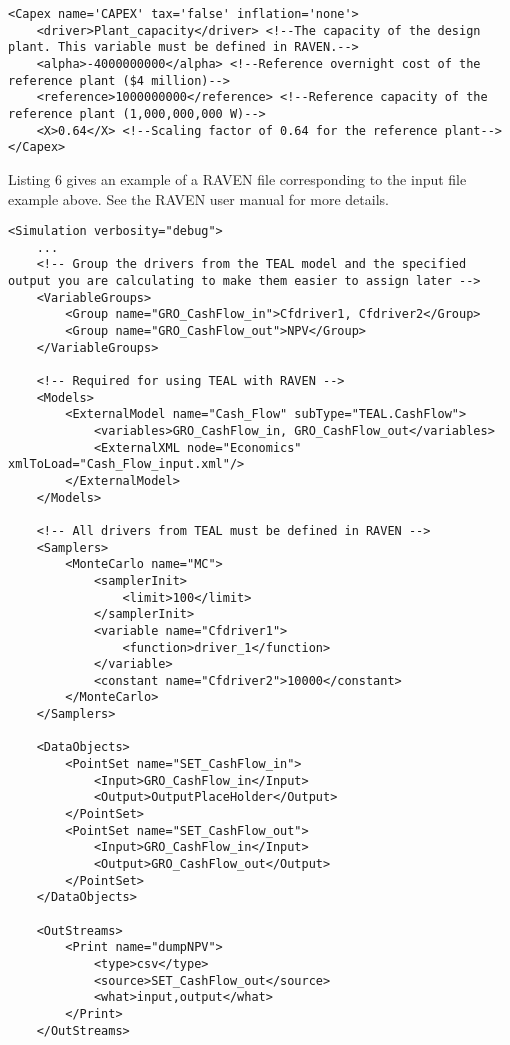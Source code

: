 \begin{lstlisting}[style=XML,morekeywords={anAttribute},caption=CashFlow input example., label=lst:CashFlowExample]
<Capex name='CAPEX' tax='false' inflation='none'>
    <driver>Plant_capacity</driver> <!--The capacity of the design plant. This variable must be defined in RAVEN.-->
    <alpha>-4000000000</alpha> <!--Reference overnight cost of the reference plant ($4 million)-->
    <reference>1000000000</reference> <!--Reference capacity of the reference plant (1,000,000,000 W)-->
    <X>0.64</X> <!--Scaling factor of 0.64 for the reference plant-->
</Capex>
\end{lstlisting}

Listing 6 gives an example of a RAVEN file corresponding to the input file example above. See the RAVEN user manual for more details.
\begin{lstlisting}[style=XML,morekeywords={anAttribute},caption=Raven input example using CashFlow \texttt{ExternalModel}., label=lst:RAVENExample]
<Simulation verbosity="debug">
    ...
    <!-- Group the drivers from the TEAL model and the specified output you are calculating to make them easier to assign later -->
    <VariableGroups>
        <Group name="GRO_CashFlow_in">Cfdriver1, Cfdriver2</Group>
        <Group name="GRO_CashFlow_out">NPV</Group>
    </VariableGroups>

    <!-- Required for using TEAL with RAVEN -->
    <Models>
        <ExternalModel name="Cash_Flow" subType="TEAL.CashFlow">
            <variables>GRO_CashFlow_in, GRO_CashFlow_out</variables>
            <ExternalXML node="Economics" xmlToLoad="Cash_Flow_input.xml"/>
        </ExternalModel>
    </Models>

    <!-- All drivers from TEAL must be defined in RAVEN -->
    <Samplers>
        <MonteCarlo name="MC">
            <samplerInit>
                <limit>100</limit>
            </samplerInit>
            <variable name="Cfdriver1">
                <function>driver_1</function>
            </variable>
            <constant name="Cfdriver2">10000</constant>
        </MonteCarlo>
    </Samplers>

    <DataObjects>
        <PointSet name="SET_CashFlow_in">
            <Input>GRO_CashFlow_in</Input>
            <Output>OutputPlaceHolder</Output>
        </PointSet>
        <PointSet name="SET_CashFlow_out">
            <Input>GRO_CashFlow_in</Input>
            <Output>GRO_CashFlow_out</Output>
        </PointSet>
    </DataObjects>

    <OutStreams>
        <Print name="dumpNPV">
            <type>csv</type>
            <source>SET_CashFlow_out</source>
            <what>input,output</what>
        </Print>
    </OutStreams>


\end{lstlisting}

